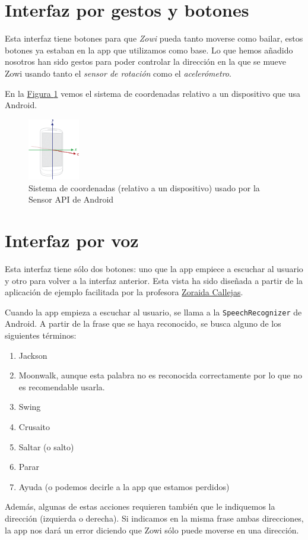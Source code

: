 \documentclass[10pt,a4paper,spanish]{article}
\begin{document}
\section{\textcolor{denim}Interfaz por gestos y botones}
Esta interfaz tiene botones para que \textit{\textcolor{denim}{Zowi}} pueda tanto moverse como bailar, estos botones ya estaban en la app que utilizamos como base. Lo que hemos añadido nosotros han sido gestos para poder controlar la dirección en la que se mueve Zowi usando tanto el \textit{\textcolor{denim}{sensor de rotación}} como el \textit{\textcolor{denim}{acelerómetro}}.

En la \hyperref[axis]{Figura \ref*{axis}} vemos el sistema de coordenadas relativo a un dispositivo que usa Android.

\begin{figure}[!h]
    \centering
    \includegraphics[width=0.2\textwidth]{axis_device}
    \caption{Sistema de coordenadas (relativo a un dispositivo) usado por la Sensor API de Android}
    \label{axis}
\end{figure}

\section{\textcolor{denim}Interfaz por voz}
Esta interfaz tiene sólo dos botones: uno que la app empiece a escuchar al usuario y otro para volver a la interfaz anterior. Esta vista ha sido diseñada a partir de la aplicación de ejemplo facilitada por la profesora \href{https://github.com/zoraidacallejas}{Zoraida Callejas}.

Cuando la app empieza a escuchar al usuario, se llama a la \texttt{\textcolor{denim}{SpeechRecognizer}} de Android. A partir de la frase que se haya reconocido, se busca alguno de los siguientes términos:

\begin{enumerate}[\qquad\ \color{denim}{$\bullet$}]
    \item Jackson
    \item Moonwalk, aunque esta palabra no es reconocida correctamente por lo que no es recomendable usarla.
    \item Swing
    \item Crusaito
    \item Saltar (o salto)
    \item Parar
    \item Ayuda (o podemos decirle a la app que estamos perdidos)
\end{enumerate}

Además, algunas de estas acciones requieren también que le indiquemos la dirección (izquierda o derecha). Si indicamos en la misma frase ambas direcciones, la app nos dará un error diciendo que Zowi sólo puede moverse en una dirección.
\end{document}
